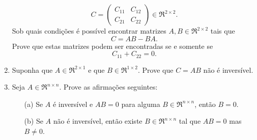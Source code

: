 \documentclass[12pt]{article}
\begin{document}
\begin{enumerate}
   \begin{equation*}
      C = 
      \begin{pmatrix}
         C_{11} & C_{12}\\
         C_{21} & C_{22}
      \end{pmatrix}
      \in \Re^{2\times 2}.
   \end{equation*}
   Sob quais condições é possível encontrar matrizes $A,B \in \Re^{2\times 2}$ tais que
   $$C = AB-BA.$$
   Prove que estas matrizes podem ser encontradas se e somente se 
   $$C_{11} + C_{22} = 0.$$
%
   \item Suponha que $A\in \Re^{2\times 1}$ e que $B\in \Re^{1\times 2}$. Prove que $C=AB$ não é inversível.
%
   \item Seja $A\in \Re^{n\times n}$. Prove as afirmações seguintes:
   \begin{itemize}
      \item[(a)] Se $A$ é inversível e $AB=0$ para alguma $B\in \Re^{n\times n}$, então $B=0$.
      \item[(b)] Se $A$ não é inversível, então existe $B\in \Re^{n\times n}$ tal que $AB=0$ mas $B\ne 0$.
   \end{itemize}
\end{enumerate}
\end{document}
